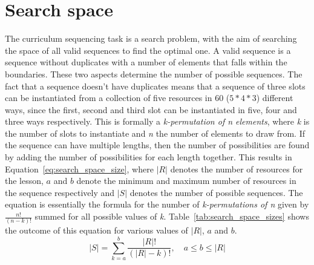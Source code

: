 \section{Search space}
\label{sec:task_search_space}
The curriculum sequencing task is a search problem, with the aim of searching the
space of all valid sequences to find the optimal one. A valid sequence is a
sequence without duplicates with a number of elements that falls within the
boundaries. These two aspects determine the number of possible sequences. 
The fact that a sequence doesn't have duplicates means that a
sequence of three slots can be instantiated from a collection of five resources in
60 ($5*4*3$) different ways, since the first, second and third slot can be
instantiated in five, four and three ways respectively. This is formally a
\emph{k-permutation of n elements}, where \emph{k} is the number of slots to
instantiate and \emph{n} the number of elements to draw from.
If the sequence can have multiple lengths, then the number of
possibilities are found by adding the
number of possibilities for each length together. This results in
Equation~\ref{eq:search_space_size}, where $|R|$ denotes the number of
resources for the lesson, $a$ and $b$ denote the minimum and maximum number of
resources in the sequence respectively and $|S|$ denotes the number of possible
sequences. The equation is essentially the formula for the number of
\emph{k-permutations of n} given by $\tfrac{n!}{(n-k)!}$ summed for all
possible values of \emph{k}.
Table~\ref{tab:search_space_sizes} shows the outcome of this 
equation for various values of $|R|$, $a$ and $b$.
\begin{equation}
	\label{eq:search_space_size}
	|S| = \sum_{k=a}^{b} \frac{|R|!}{(|R|-k)!}, \quad a \le b \le |R|
\end{equation}
